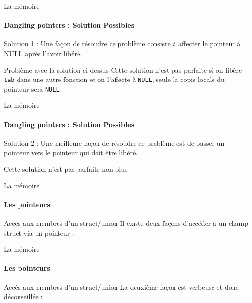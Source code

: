 \documentclass{beamer}
\begin{document}
\begin{darkframes}
	\begin{frame}{La mémoire}
		\framesubtitle{Dangling pointers : Solution Possibles}
		\begin{block}{Solution 1 :}
			Une façon de résoudre ce problème consiste à affecter le pointeur à NULL après l'avoir libéré.
			\danglingPtrTwoSolutionTemp
		\end{block}
		\begin{alertblock}{Problème avec la solution ci-dessus}
			Cette solution n'est pas parfaite si on libére \texttt{tab} dans une autre fonction et on l'affecte à \texttt{NULL}, seule la copie locale du pointeur sera \texttt{NULL}.
		\end{alertblock}
	\end{frame}

	\begin{frame}{La mémoire}
		\framesubtitle{Dangling pointers : Solution Possibles}
		\begin{block}{Solution 2 :}
			Une meilleure façon de résoudre ce problème est de passer un pointeur vers le pointeur qui doit être libéré.
			\danglingPtrTwoSolution
		\end{block}
		\begin{alertblock}{Cette solution n'est pas parfaite non plus}
		\end{alertblock}
	\end{frame}
	
	\begin{frame}{La mémoire}
		\framesubtitle{Les pointeurs}
		\begin{block}{Accès aux membres d'un struct/union}
			Il existe deux façons d'accéder à un champ struct via un pointeur :\\ 
			\ptrStructSyntaxOne
		\end{block}
	\end{frame}

	\begin{frame}{La mémoire}
		\framesubtitle{Les pointeurs}
		\begin{block}{Accès aux membres d'un struct/union}
			La deuxième façon est verbeuse et donc déconseillée :\\
			\ptrStructSyntaxTwo
		\end{block}
	\end{frame}
	

\end{darkframes}
\end{document}
